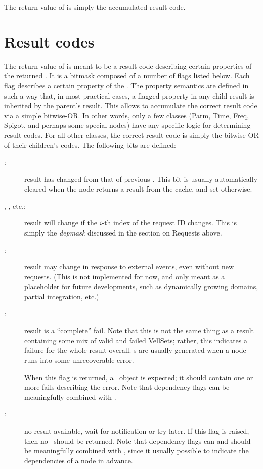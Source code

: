 \documentclass[10pt,twoside]{book}
\begin{document}
  The return value of  is simply the accumulated result code.
  
\section{Result codes}

  The return value of  is meant to be a result code describing
  certain properties  of the returned \Result. It is a bitmask composed of a
  number of flags listed below. Each flag describes a certain property of the
  \Result. The property semantics are defined in such a way that, in most
  practical cases, a flagged property in any child result is inherited by the
  parent's result. This allows  to accumulate the correct result
  code via a simple bitwise-OR. In other words, only a few classes (Parm, Time,
  Freq, Spigot, and perhaps some special nodes) have any specific logic for
  determining result codes. For all other classes, the correct result code is
  simply the bitwise-OR of their children's codes. The following bits are
  defined:
  
  \begin{description}
  
  \item[:] result has changed from that of previous \Request. This
    bit is usually automatically cleared when the node returns a result 
    from the cache, and set otherwise.
     
  \item[, , etc.:] result will change if the $i$-th
    index of the request ID changes. This is simply the {\em depmask\/} discussed
    in the section on Requests above.

  \item[:] result may change in response to external events,
    even without new requests. (This is not implemented for now, and only meant
    as a placeholder for future developments, such as dynamically growing
    domains, partial integration, etc.)

  \item[:] result is a ``complete'' fail. Note that this is not the
    same thing as a result containing some mix of valid and failed VellSets;
    rather, this indicates a failure for the whole result overall. s
    are usually generated when a node runs into some unrecoverable error.
    
    When this flag is returned, a \Result\ object is expected; it should
    contain one or more fails describing the error. Note that dependency flags
    can be meaningfully combined with .

  \item[:] no result available, wait for notification or try later.
    If this flag is raised, then no \Result\ should be returned. Note that
    dependency flags can and should be meaningfully combined with ,
    since it usually possible to indicate the dependencies of a node in
    advance.

  \end{description}
  
\end{document}
